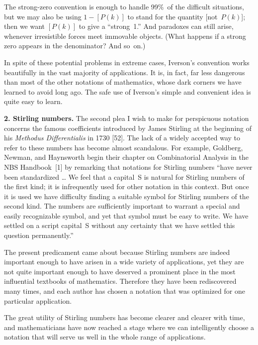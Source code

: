 The strong-zero convention is enough to handle 99\%\ of the
difficult situations,
but we may also be using $1-[P(k)]$ to stand for the
quantity
[not~$P(k)$]; then we want $[P(k)]$ to give a ``strong~1.''  And
paradoxes can still arise, whenever irresistible forces meet immovable
objects. (What happens if a strong zero appears in the denominator?
And so~on.)

In spite of these potential problems in extreme cases, Iverson's
convention works beautifully in the vast majority of applications. It
is, in fact, far less dangerous than most of the other notations of
mathematics, whose dark corners we have learned to avoid long ago.
The safe use of Iverson's simple and convenient idea is quite easy to
learn. 

\bigskip\noindent
{\bf 2. Stirling numbers.}\enspace
The second plea I wish to make for perspicuous notation concerns the
famous coefficients introduced by James Stirling at the beginning of
his {\sl Methodus Differentialis\/} in 1730 [52]. The lack of a widely
accepted way to refer to these numbers has become almost scandalous. For
example, Goldberg, Newman, and Haynsworth begin their chapter on
Combinatorial Analysis in the NBS Handbook~[1] by remarking that
notations for Stirling numbers ``have never been standardized \dots
We feel that a capital~S is natural for Stirling numbers of the first
kind; it is infrequently used for other notation in this context. But
once it is used we have difficulty finding a suitable symbol for
Stirling numbers of the second kind. The numbers are sufficiently
important to warrant a special and easily recognizable symbol, and yet
that symbol must be easy to write. We have settled on a script
capital~{\eusm S} without any certainty that we have settled this
question permanently.''

The present predicament came about because Stirling numbers are indeed
important enough to have arisen in a wide variety of applications, yet
they are not quite important enough to have deserved a prominent place
in the most influential textbooks of mathematics. Therefore they have
been rediscovered many times, and each author has chosen a notation
that was optimized for one particular application.

The great utility of Stirling numbers has become clearer and
clearer with time, and mathematicians have now reached a stage where we can
intelligently choose a notation that will serve us well in the whole
range of applications.

